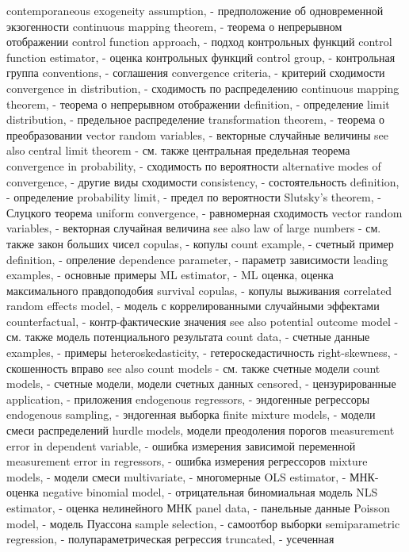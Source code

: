 contemporaneous exogeneity assumption, - предположение об одновременной экзогенности
continuous mapping theorem, - теорема о непрерывном отображении
control function approach, - подход контрольных функций
control function estimator, - оценка контрольных функций
control group, - контрольная группа
conventions, - соглашения
convergence criteria, - критерий сходимости
convergence in distribution, - сходимость по распределению
continuous mapping theorem, - теорема о непрерывном отображении
definition, - определение
limit distribution, - предельное распределение
transformation theorem, - теорема о преобразовании
vector random variables, - векторные случайные величины
see also central limit theorem - см. также центральная предельная теорема
convergence in probability, - сходимость по вероятности
alternative modes of convergence, - другие виды сходимости
consistency, - состоятельность
definition, - определение
probability limit, - предел по вероятности
Slutsky’s theorem, - Слуцкого теорема
uniform convergence, - равномерная сходимость
vector random variables, - векторная случайная величина
see also law of large numbers - см. также закон больших чисел
copulas, - копулы
count example, - счетный пример
definition, - опреление
dependence parameter, - параметр зависимости
leading examples, - основные примеры
ML estimator, - ML оценка, оценка максимального правдоподобия
survival copulas, - копулы выживания
correlated random effects model, - модель с коррелированными случайными эффектами
counterfactual, - контр-фактические значения
see also potential outcome model - см. также модель потенциального результата
count data, - счетные данные
examples, - примеры
heteroskedasticity, - гетероскедастичность
right-skewness, - скошенность вправо
see also count models - см. также счетные модели
count models, - счетные модели, модели счетных данных
censored, - цензурированные
application, - приложения
endogenous regressors, - эндогенные регрессоры
endogenous sampling, - эндогенная выборка
finite mixture models, - модели смеси распределений
hurdle models, модели преодоления порогов
measurement error in dependent variable, - ошибка измерения зависимой переменной
measurement error in regressors, - ошибка измерения регрессоров
mixture models, - модели смеси
multivariate, - многомерные
OLS estimator, - МНК-оценка
negative binomial model, - отрицательная биномиальная модель
NLS estimator, - оценка нелинейного МНК
panel data, - панельные данные
Poisson model, - модель Пуассона
sample selection, - самоотбор выборки
semiparametric regression, - полупараметрическая регрессия
truncated, - усеченная
